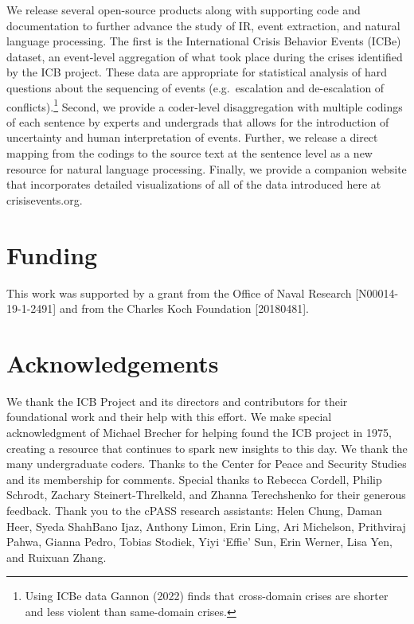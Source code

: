 \documentclass{article}
\begin{document}
We release several open-source products along with supporting code and
documentation to further advance the study of IR, event extraction, and
natural language processing. The first is the International Crisis
Behavior Events (ICBe) dataset, an event-level aggregation of what took
place during the crises identified by the ICB project. These data are
appropriate for statistical analysis of hard questions about the
sequencing of events (e.g.~escalation and de-escalation of
conflicts).\footnote{Using ICBe data Gannon (2022) finds that
  cross-domain crises are shorter and less violent than same-domain
  crises.} Second, we provide a coder-level disaggregation with multiple
codings of each sentence by experts and undergrads that allows for the
introduction of uncertainty and human interpretation of events. Further,
we release a direct mapping from the codings to the source text at the
sentence level as a new resource for natural language processing.
Finally, we provide a companion website that incorporates detailed
visualizations of all of the data introduced here at crisisevents.org.

\hypertarget{funding}{%
\section{Funding}\label{funding}}

This work was supported by a grant from the Office of Naval Research
{[}N00014-19-1-2491{]} and from the Charles Koch Foundation
{[}20180481{]}.

\hypertarget{acknowledgements}{%
\section{Acknowledgements}\label{acknowledgements}}

We thank the ICB Project and its directors and contributors for their
foundational work and their help with this effort. We make special
acknowledgment of Michael Brecher for helping found the ICB project in
1975, creating a resource that continues to spark new insights to this
day. We thank the many undergraduate coders. Thanks to the Center for
Peace and Security Studies and its membership for comments. Special
thanks to Rebecca Cordell, Philip Schrodt, Zachary Steinert-Threlkeld,
and Zhanna Terechshenko for their generous feedback. Thank you to the
cPASS research assistants: Helen Chung, Daman Heer, Syeda ShahBano Ijaz,
Anthony Limon, Erin Ling, Ari Michelson, Prithviraj Pahwa, Gianna Pedro,
Tobias Stodiek, Yiyi `Effie' Sun, Erin Werner, Lisa Yen, and Ruixuan
Zhang.
\end{document}
